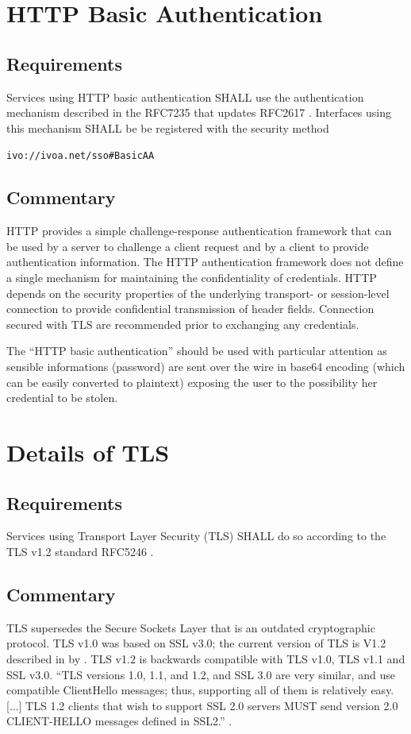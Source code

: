 \documentclass[11pt,a4paper]{ivoa}
\begin{document}
\section{HTTP Basic Authentication}
\subsection{Requirements}
Services using HTTP basic authentication SHALL use the authentication mechanism described in the RFC7235 \citep{std:RFC7235}
that updates RFC2617  \citep{std:RFC2617}. 
Interfaces using this mechanism SHALL be be registered with the security method 

 \texttt{ivo://ivoa.net/sso\#BasicAA}

\subsection{Commentary}
HTTP provides a simple challenge-response authentication framework that can be used by a server to challenge 
a client request and by a   client to provide authentication information.
The HTTP authentication framework does not define a single mechanism for maintaining the confidentiality of credentials. 
HTTP depends on the security properties of the underlying transport-   or session-level connection to provide 
confidential transmission of   header fields. Connection secured with TLS are recommended prior to exchanging any credentials.

The ``HTTP basic authentication'' should be used with particular attention as sensible
informations (password) are sent over the wire in base64 encoding (which can be easily converted to plaintext) exposing
the user to the possibility her credential to be stolen.

\section{Details of TLS}
\subsection{Requirements}
Services using Transport Layer Security (TLS) SHALL do so according to the TLS v1.2 standard RFC5246 \citep{std:RFC5246}.

\subsection{Commentary}
TLS supersedes the Secure Sockets Layer that is an outdated cryptographic protocol.   
TLS v1.0 was based on SSL v3.0; the current version of TLS is V1.2 described in by \citet{std:RFC5246}.  
TLS v1.2 is backwards compatible with TLS v1.0, TLS v1.1 and SSL v3.0. 
``TLS versions 1.0, 1.1, and 1.2, and SSL 3.0 are very similar, and use compatible ClientHello messages; 
thus, supporting all of them is   relatively easy.[...] TLS 1.2 clients that wish to support SSL 2.0 servers MUST 
send  version 2.0 CLIENT-HELLO messages defined in SSL2.'' \citep{std:RFC5246}.
\end{document}
